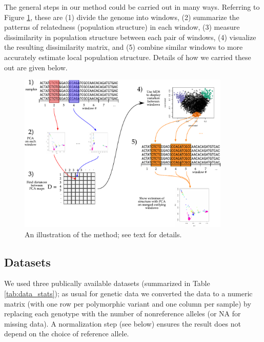 \documentclass[11pt, oneside]{article}   	%
\begin{document}
The general steps in our method could be carried out in many ways.
Referring to Figure \ref{fig:diagram}, these are
(1) divide the genome into windows,
(2) summarize the patterns of relatedness (population structure) in each window,
(3) measure dissimilarity in population structure between each pair of windows,
(4) visualize the resulting dissimilarity matrix,
and (5) combine similar windows to more accurately estimate local population structure.
Details of how we carried these out are given below.

\begin{figure}
    \begin{center}
       \includegraphics[width=0.9\textwidth]{the-method-diagram}
    \end{center}
    \caption{
         An illustration of the method; see text for details.
         \label{fig:diagram}
    }
\end{figure}



\subsection{Datasets}

We used three publically available datasets (summarized in Table \ref{tab:data_stats});
as usual for genetic data we converted the data to a numeric matrix
(with one row per polymorphic variant and one column per sample)
by replacing each genotype with the number of nonreference alleles
(or NA for missing data).
A normalization step (see below) ensures the result does not depend on the choice of reference allele.
\end{document}

